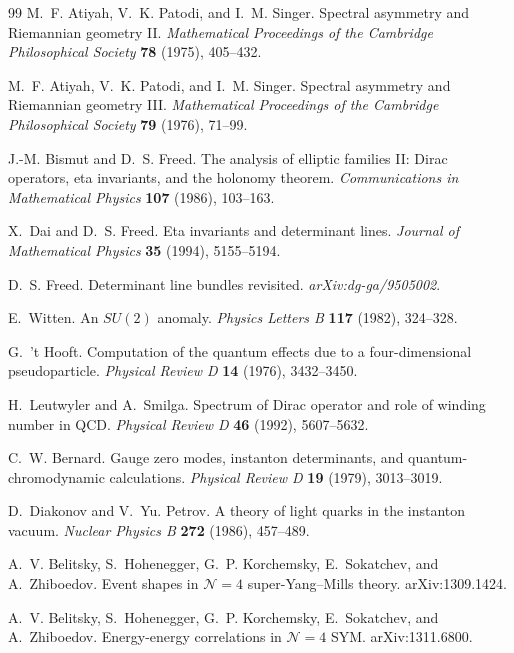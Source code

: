 \begin{thebibliography}{99}
M.~F. Atiyah, V.~K. Patodi, and I.~M. Singer.
Spectral asymmetry and Riemannian geometry II.
\emph{Mathematical Proceedings of the Cambridge Philosophical Society}
\textbf{78} (1975), 405--432.

M.~F. Atiyah, V.~K. Patodi, and I.~M. Singer.
Spectral asymmetry and Riemannian geometry III.
\emph{Mathematical Proceedings of the Cambridge Philosophical Society}
\textbf{79} (1976), 71--99.

J.-M. Bismut and D.~S. Freed.
The analysis of elliptic families II: Dirac operators, eta invariants, and
the holonomy theorem.
\emph{Communications in Mathematical Physics} \textbf{107} (1986), 103--163.

X.~Dai and D.~S. Freed.
Eta invariants and determinant lines.
\emph{Journal of Mathematical Physics} \textbf{35} (1994), 5155--5194.

D.~S. Freed.
Determinant line bundles revisited.
\emph{arXiv:dg-ga/9505002}.

E.~Witten.
An \(SU(2)\) anomaly.
\emph{Physics Letters B} \textbf{117} (1982), 324--328.

G.~'t Hooft.
Computation of the quantum effects due to a four-dimensional pseudoparticle.
\emph{Physical Review D} \textbf{14} (1976), 3432--3450.

H.~Leutwyler and A.~Smilga.
Spectrum of Dirac operator and role of winding number in QCD.
\emph{Physical Review D} \textbf{46} (1992), 5607--5632.

C.~W. Bernard.
Gauge zero modes, instanton determinants, and quantum-chromodynamic calculations.
\emph{Physical Review D} \textbf{19} (1979), 3013--3019.

D.~Diakonov and V.~Yu. Petrov.
A theory of light quarks in the instanton vacuum.
\emph{Nuclear Physics B} \textbf{272} (1986), 457--489.

A.~V. Belitsky, S.~Hohenegger, G.~P. Korchemsky, E.~Sokatchev, and
A.~Zhiboedov.
Event shapes in \(\mathcal N=4\) super-Yang--Mills theory.
arXiv:1309.1424.

A.~V. Belitsky, S.~Hohenegger, G.~P. Korchemsky, E.~Sokatchev, and
A.~Zhiboedov.
Energy-energy correlations in \(\mathcal N=4\) SYM.
arXiv:1311.6800.


\end{thebibliography}
